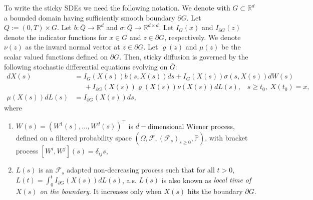 \documentclass{article}
\theoremstyle{definition}
\numberwithin{equation}{section}
\begin{document}
To write the sticky SDEs we need the following notation. We denote with $G \subset \mathbb{R}^{d}$ a bounded domain having sufficiently smooth boundary $\partial G$. Let $Q := (0,T)\times G$. Let $b : \bar{Q} \rightarrow \mathbb{R}^{d}$ and $\sigma : \bar{Q} \rightarrow \mathbb{R}^{d\times d}$.  Let $I_{G}(x)$ and $I_{\partial G}(z)$ denote the indicator functions for $x \in G$ and $z \in\partial G $, respectively. We denote $\nu(z)$ as the inward normal vector at $z \in \partial G$.  Let $\varrho(z)$ and $\mu(z)$ be the scalar valued functions defined on $\partial G$.
Then, sticky diffusion is governed by the following stochastic differential equations evolving on $\bar G$:
\begin{align}
    dX(s) &= I_{G}(X(s))b(s,X(s))ds + I_{G}(X(s))\sigma(s,X(s))dW(s) \nonumber \\ & \;\;\;\;\; + I_{\partial G}(X(s))\varrho(X(s))\nu(X(s))dL(s),\;\;\;s \geq t_{0}, \; X(t_{0}) = x, \label{alsde1} \\ 
    \mu(X(s))dL(s) &= I_{\partial G}(X(s))ds, \label{alsde2}
\end{align}    
where \vspace{-3pt}
\begin{enumerate}[label= (\roman*)]
 \item $W(s) = (W^{1}(s),\dots,W^{d}(s))^{\top}$ is $d-$dimensional Wiener process, defined on a filtered probability space $(\Omega,\mathscr{F},(\mathscr{F}_{s})_{s\geq 0},\mathbb{P})$, with bracket process $[W^{i},W^{j}](s) = \delta_{ij}s$, \vspace{-3pt}
    \item $L(s)$ is an $\mathcal{F}_{s}$ adapted non-decreasing process such that for all $t>0$, $L(t) = \int_{0}^{t}I_{\partial G}(X(s))dL(s)$, a.s. $L(s)$ is also known as \textit{local time of $X(s)$ on the boundary}. It increases only when $X(s)$ hits the boundary $\partial G$.
    
\end{enumerate}
\end{document}
